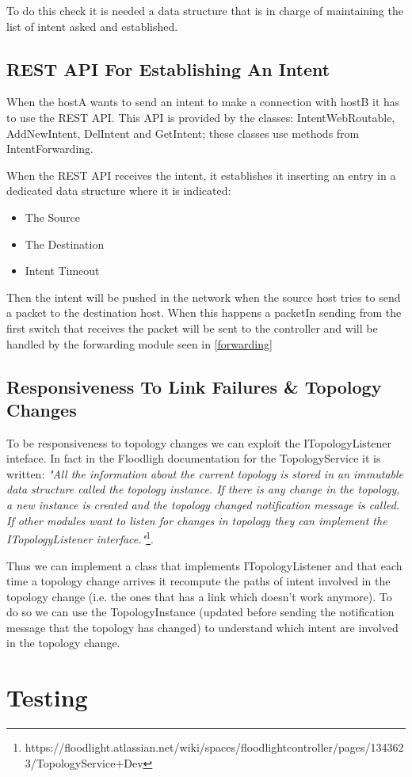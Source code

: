\documentclass[a4paper]{report}
\begin{document}
	\noindent To do this check it is needed a data structure that is in charge of maintaining the list of intent asked and established.
	
	\section{REST API For Establishing An Intent}
	\noindent When the hostA wants to send an intent to make a connection with hostB it has to use the REST API. This API is provided by the classes: IntentWebRoutable, AddNewIntent, DelIntent and GetIntent; these classes use methods from IntentForwarding.
	
	\noindent When the REST API receives the intent, it establishes it inserting an entry in a dedicated data structure where it is indicated:
	\begin{itemize}
	\item The Source
	\item The Destination
	\item Intent Timeout
	\end{itemize}
	
	\noindent Then the intent will be pushed in the network when the source host tries to send a packet to the destination host. When this happens a packetIn sending from the first switch that receives the packet will be sent to the controller and will be handled by the forwarding module seen in \ref{forwarding}
	
	\section{Responsiveness To Link Failures \& Topology Changes}
	To be responsiveness to topology changes we can exploit the ITopologyListener inteface. In fact in the Floodligh documentation for the TopologyService it is written: \textit{"All the information about the current topology is stored in an immutable data structure called the topology instance. If there is any change in the topology, a new instance is created and the topology changed notification message is called. If other modules want to listen for changes in topology they can implement the ITopologyListener interface."}\footnote{https://floodlight.atlassian.net/wiki/spaces/floodlightcontroller/pages/1343623/TopologyService+Dev}.
	
	\noindent Thus we can implement a class that implements ITopologyListener and that each time a topology change arrives it recompute the paths of intent involved in the topology change (i.e. the ones that has a link which doesn't work anymore). To do so we can use the TopologyInstance (updated before sending the notification message that the topology has changed) to understand which intent are involved in the topology change.
	
	\chapter{Testing}
	
\end{document}
